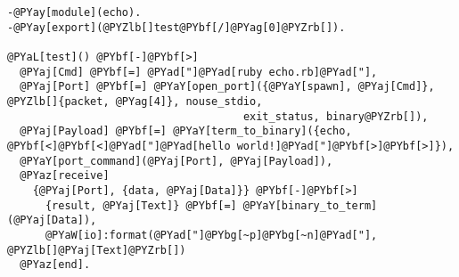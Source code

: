 \begin{Verbatim}[commandchars=@\[\]]
-@PYay[module](echo).
-@PYay[export](@PYZlb[]test@PYbf[/]@PYag[0]@PYZrb[]).

@PYaL[test]() @PYbf[-]@PYbf[>]
  @PYaj[Cmd] @PYbf[=] @PYad["]@PYad[ruby echo.rb]@PYad["],
  @PYaj[Port] @PYbf[=] @PYaY[open_port]({@PYaY[spawn], @PYaj[Cmd]}, @PYZlb[]{packet, @PYag[4]}, nouse_stdio,
                                     exit_status, binary@PYZrb[]),
  @PYaj[Payload] @PYbf[=] @PYaY[term_to_binary]({echo, @PYbf[<]@PYbf[<]@PYad["]@PYad[hello world!]@PYad["]@PYbf[>]@PYbf[>]}),
  @PYaY[port_command](@PYaj[Port], @PYaj[Payload]),
  @PYaz[receive]
    {@PYaj[Port], {data, @PYaj[Data]}} @PYbf[-]@PYbf[>]
      {result, @PYaj[Text]} @PYbf[=] @PYaY[binary_to_term](@PYaj[Data]),
      @PYaW[io]:format(@PYad["]@PYbg[~p]@PYbg[~n]@PYad["], @PYZlb[]@PYaj[Text]@PYZrb[])
  @PYaz[end].
\end{Verbatim}
